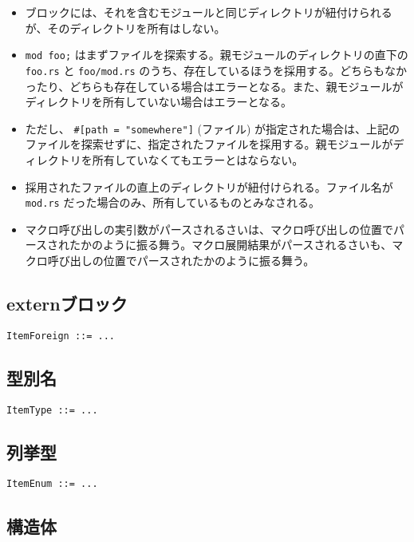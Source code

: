 \documentclass[dvipdfmx,uplatex,papersize,a4paper,10pt]{jsbook}
\theoremstyle{definition}
\begin{document}
\begin{itemize}
\begin{itemize}
      \item ブロックには、それを含むモジュールと同じディレクトリが紐付けられるが、そのディレクトリを所有はしない。
      \item \verb|mod foo;| はまずファイルを探索する。親モジュールのディレクトリの直下の \verb|foo.rs| と \verb|foo/mod.rs| のうち、存在しているほうを採用する。どちらもなかったり、どちらも存在している場合はエラーとなる。また、親モジュールがディレクトリを所有していない場合はエラーとなる。
      \item ただし、 \verb|#[path = "somewhere"]| (ファイル) が指定された場合は、上記のファイルを探索せずに、指定されたファイルを採用する。親モジュールがディレクトリを所有していなくてもエラーとはならない。
      \item 採用されたファイルの直上のディレクトリが紐付けられる。ファイル名が \verb|mod.rs| だった場合のみ、所有しているものとみなされる。
      \item マクロ呼び出しの実引数がパースされるさいは、マクロ呼び出しの位置でパースされたかのように振る舞う。マクロ展開結果がパースされるさいも、マクロ呼び出しの位置でパースされたかのように振る舞う。
    \end{itemize}
\end{itemize}

\subsection{externブロック}

\begin{lstlisting}[language=BNFLike, gobble=2]
  ItemForeign ::= ...
\end{lstlisting}

\subsection{型別名}

\begin{lstlisting}[language=BNFLike, gobble=2]
  ItemType ::= ...
\end{lstlisting}

\subsection{列挙型}

\begin{lstlisting}[language=BNFLike, gobble=2]
  ItemEnum ::= ...
\end{lstlisting}

\subsection{構造体}
\end{document}
